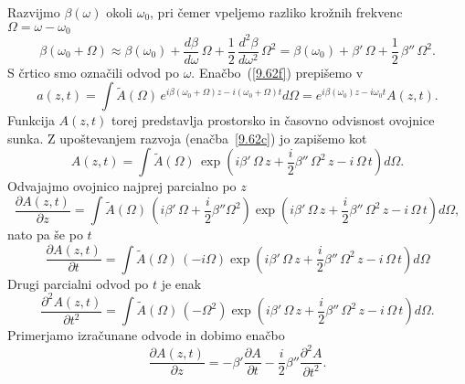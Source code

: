 Razvijmo $\beta(\omega)$
okoli $\omega_{0}$, pri čemer vpeljemo razliko krožnih frekvenc $\Omega = \omega - \omega_0$
\begin{equation}
\beta(\omega_0 + \Omega) \approx \beta(\omega_{0})
+\frac{d\beta}{d\omega}\,\Omega+\frac{1}{2}\,\frac{d^{2}\beta}{d\omega^{2}}\,\Omega^{2} = 
\beta(\omega_{0}) +\beta '\,\Omega+\frac{1}{2}\,\beta ''\,\Omega^{2}.
\label{9.62c}
\end{equation}
S črtico smo označili odvod po $\omega$. Enačbo~(\ref{9.62f}) prepišemo v 
\begin{equation}
a\left(z,t\right)=\int \tilde{A}(\Omega)\, e^{i \beta (\omega_0 + \Omega)z - 
i(\omega_0 + \Omega) t}d\Omega  =  e^{i \beta (\omega_0)z - i\omega_0 t} A(z,t).
\label{9.62b}
\end{equation}
Funkcija $A(z, t)$ torej predstavlja prostorsko in časovno odvisnost ovojnice sunka. Z upoštevanjem
razvoja (enačba~\ref{9.62c}) jo zapišemo kot 
\begin{equation}
 A(z,t) = \int \tilde{A}(\Omega)\, \exp \left(i \beta'\, \Omega\,z + 
 \frac{i}{2}\beta''\,\Omega^2\, z - i\, \Omega\, t\right) d\Omega.
 \label{eq:ovojnica967}
\end{equation}
Odvajajmo ovojnico najprej parcialno po $z$
\begin{equation}
 \frac{\partial A(z,t)}{\partial z} = \int \tilde{A}(\Omega)\, 
 \left(i \beta'\, \Omega + \frac{i}{2}\beta''\Omega^2 \right) 
 \exp \left(i \beta'\, \Omega\,z + 
 \frac{i}{2}\beta''\,\Omega^2\, z - i\, \Omega\, t\right) d\Omega,
\label{9.67a}
\end{equation}
nato pa še po $t$
\begin{equation}
 \frac{\partial A(z,t)}{\partial t} = \int \tilde{A}(\Omega)\, 
 \left(-i\Omega\right) 
 \exp \left(i \beta'\, \Omega\,z + 
 \frac{i}{2}\beta''\,\Omega^2\, z - i\, \Omega\, t\right) d\Omega
\label{9.67b}
\end{equation}
Drugi parcialni odvod po $t$ je enak
\begin{equation}
 \frac{\partial^2 A(z,t)}{\partial t^2} = \int \tilde{A}(\Omega)\, 
 \left(-\Omega^2\right) 
 \exp \left(i \beta'\, \Omega\,z + 
 \frac{i}{2}\beta''\,\Omega^2\, z - i\, \Omega\, t\right) d\Omega.
\label{9.67c}
\end{equation}
Primerjamo izračunane odvode in dobimo enačbo
\begin{equation}
 \frac{\partial A(z,t)}{\partial z} = -\beta'\frac{\partial A}{\partial t} - \frac{i}{2} \beta''\frac{\partial^2 A}{\partial t^2}.
 \label{9.68b}
\end{equation}
